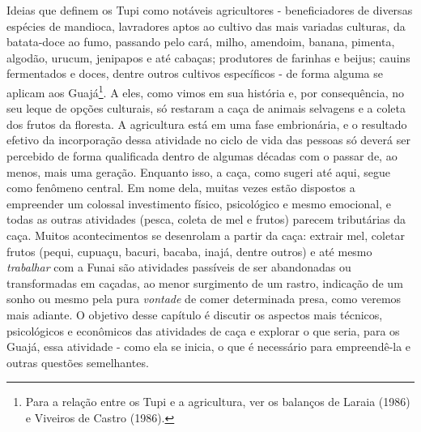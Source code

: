 \noindent Ideias que definem os Tupi como notáveis agricultores - beneficiadores
de diversas espécies de mandioca, lavradores aptos ao cultivo das mais
variadas culturas, da batata-doce ao fumo, passando pelo cará, milho,
amendoim, banana, pimenta, algodão, urucum, jenipapos e até cabaças;
produtores de farinhas e beijus; cauins fermentados e doces, dentre
outros cultivos específicos - de forma alguma se aplicam aos
Guajá\footnote{Para a relação entre os Tupi e a agricultura, ver os
  balanços de Laraia (1986) e Viveiros de Castro (1986).}. A eles, como
vimos em sua história e, por consequência, no seu leque de opções
culturais, só restaram a caça de animais selvagens e a coleta dos frutos
da floresta. A agricultura está em uma fase embrionária, e o resultado
efetivo da incorporação dessa atividade no ciclo de vida das pessoas só
deverá ser percebido de forma qualificada dentro de algumas décadas com
o passar de, ao menos, mais uma geração. Enquanto isso, a caça, como
sugeri até aqui, segue como fenômeno central. Em nome dela, muitas vezes
estão dispostos a empreender um colossal investimento físico,
psicológico e mesmo emocional, e todas as outras atividades (pesca,
coleta de mel e frutos) parecem tributárias da caça. Muitos
acontecimentos se desenrolam a partir da caça: extrair mel, coletar
frutos (pequi, cupuaçu, bacuri, bacaba, inajá, dentre outros) e até
mesmo \emph{trabalhar} com a Funai são atividades passíveis de ser
abandonadas ou transformadas em caçadas, ao menor surgimento de um
rastro, indicação de um sonho ou mesmo pela pura \emph{vontade} de comer
determinada presa, como veremos mais adiante. O objetivo desse capítulo
é discutir os aspectos mais técnicos, psicológicos e econômicos das
atividades de caça e explorar o que seria, para os Guajá, essa atividade
- como ela se inicia, o que é necessário para empreendê-la e outras
questões semelhantes.

